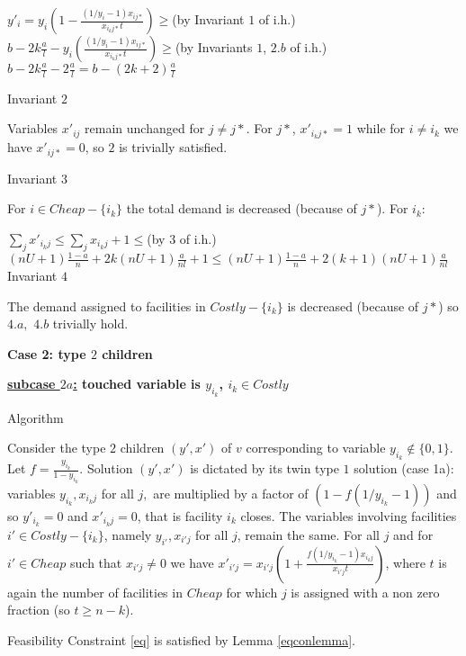 \documentclass[11pt]{article}\usepackage{amsmath}
\begin{document}
\noindent
$y'_i=y_i(1-\frac{(1/y_{i}-1)x_{ij*}}{x_{i_kj*}t})\geq$\hfill (by Invariant $1$ of i.h.)\\
$b-2k\frac{a}{l}
-y_i(\frac{(1/y_{i}-1)x_{ij*}}{x_{i_kj*}t})\geq$\hfill (by Invariants
$1$, $2.b$ of i.h.)\\
$b-2k\frac{a}{l}- 2\frac{a}{l} = b-(2k+2)\frac{a}{l}$

{\sf Invariant $2$}

Variables $x'_{ij}$ remain unchanged for $j\neq j*$. For $j*$, $x'_{i_kj*}=1$ while for $i\neq i_k$
we have $x'_{ij*}=0$, so $2$ is trivially satisfied.

{\sf Invariant $3$}

For $i\in Cheap-\{i_k\}$ the total demand is decreased (because of $j*$). For $i_k$:

\noindent
$\sum_j x'_{i_kj}\leq \sum_j x_{i_kj} +1\leq$\hfill (by $3$ of i.h.)\\
$(nU+1)\frac{1-a}{n}+2k(nU+1)\frac{a}{nl}+1\leq (nU+1)\frac{1-a}{n}+2(k+1)(nU+1)\frac{a}{nl}$\\

{\sf Invariant $4$}

The demand assigned to facilities in $Costly-\{i_k\}$ is decreased  (because of $j*$) 
so $4.a,$ $4.b$ trivially hold. 





\medskip \medskip
\noindent
{\bf Case 2: type $2$ children}

\noindent 
{\bf \underline{subcase $2a$:} touched variable is  $y_{i_k}$, $i_k \in Costly$}

{\sc Algorithm}

Consider the type $2$ children $(y',x')$ of $v$ corresponding to variable $y_{i_k}\notin \{0,1\}$.
Let $f=\frac{y_{i_k}}{1-y_{i_k}}$. Solution $(y',x')$ is dictated by its twin type $1$ solution (case 1a):
 variables $y_{i_k},x_{i_kj}$ for all $j,$ are multiplied by a factor of $(1-f(1/y_{i_k}-1))$ and so  $y'_{i_k}=0$ and $x'_{i_kj}=0$, that is facility $i_k$ closes. The variables involving facilities $i' \in Costly-\{i_k\}$, namely $y_{i'},x_{i'j}$ for all $j$, remain the same. 
For all $j$ and for $i' \in Cheap$ such that $x_{i'j}\neq 0$ we have $x'_{i'j}=x_{i'j}(1+\frac{f(1/y_{i_k}-1)x_{i_kj}}{x_{i'j}t})$, where $t$ is again the number of
facilities in $Cheap$ for which $j$ is assigned with a non zero fraction (so $t \geq n-k$).


{\sc Feasibility}
Constraint \eqref{eq} is satisfied by Lemma \ref{eqconlemma}.
\end{document}

